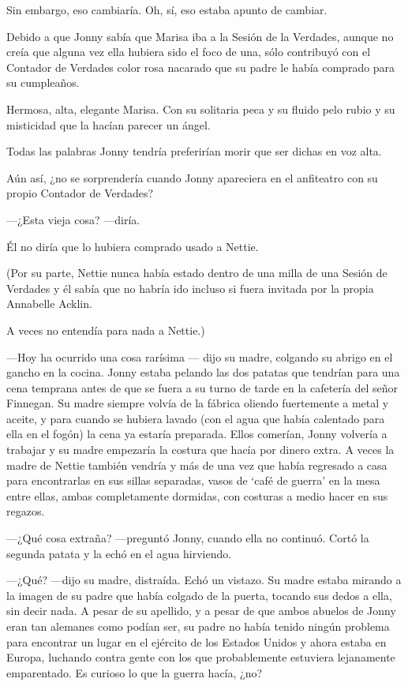 Sin embargo, eso cambiaría. Oh, sí, eso estaba apunto de cambiar.

Debido a que Jonny sabía que Marisa iba a la Sesión de la Verdades,
aunque no creía que alguna vez ella hubiera sido el foco de una, sólo
contribuyó con el Contador de Verdades color rosa nacarado que su padre
le había comprado para su cumpleaños.

Hermosa, alta, elegante Marisa. Con su solitaria peca y su fluido pelo
rubio y su misticidad que la hacían parecer un ángel.

Todas las palabras Jonny tendría preferirían morir que ser dichas en voz
alta.

Aún así, ¿no se sorprendería cuando Jonny apareciera en el anfiteatro
con su propio Contador de Verdades?

---¿Esta vieja cosa? ---diría.

Él no diría que lo hubiera comprado usado a Nettie.

(Por su parte, Nettie nunca había estado dentro de una milla de una
Sesión de Verdades y él sabía que no habría ido incluso si fuera
invitada por la propia Annabelle Acklin.

A veces no entendía para nada a Nettie.)

---Hoy ha ocurrido una cosa rarísima --- dijo su madre, colgando su
abrigo en el gancho en la cocina. Jonny estaba pelando las dos patatas
que tendrían para una cena temprana antes de que se fuera a su turno de
tarde en la cafetería del señor Finnegan. Su madre siempre volvía de la
fábrica oliendo fuertemente a metal y aceite, y para cuando se hubiera
lavado (con el agua que había calentado para ella en el fogón) la cena
ya estaría preparada. Ellos comerían, Jonny volvería a trabajar y su
madre empezaría la costura que hacía por dinero extra. A veces la madre
de Nettie también vendría y más de una vez que había regresado a casa
para encontrarlas en sus sillas separadas, vasos de `café de guerra' en
la mesa entre ellas, ambas completamente dormidas, con costuras a medio
hacer en sus regazos.

---¿Qué cosa extraña? ---preguntó Jonny, cuando ella no continuó. Cortó
la segunda patata y la echó en el agua hirviendo.

---¿Qué? ---dijo su madre, distraída. Echó un vistazo. Su madre estaba
mirando a la imagen de su padre que había colgado de la puerta, tocando
sus dedos a ella, sin decir nada. A pesar de su apellido, y a pesar de
que ambos abuelos de Jonny eran tan alemanes como podían ser, su padre
no había tenido ningún problema para encontrar un lugar en el ejército
de los Estados Unidos y ahora estaba en Europa, luchando contra gente
con los que probablemente estuviera lejanamente emparentado. Es curioso
lo que la guerra hacía, ¿no?

